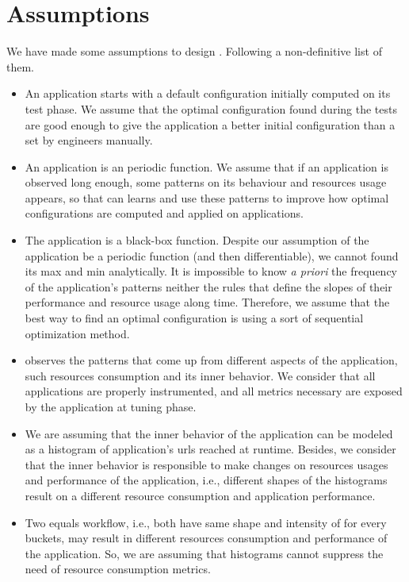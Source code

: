 \section{Assumptions}

We have made some assumptions to design \name. Following a non-definitive list of them.

\begin{itemize}

\item An application starts with a default configuration initially computed on its test phase. We assume that the
  optimal configuration found during the tests are good enough to give the application a better initial configuration
    than a set by engineers manually.

\item An application is an periodic function. We assume that if an application is observed long enough, some patterns
  on its behaviour and resources usage appears, so that \name can learns and use these patterns to improve how optimal
    configurations are computed and applied on applications.

\item The application is a black-box function. Despite our assumption of the application be a periodic function (and
  then differentiable), we cannot found its max and min analytically. It is impossible to know \textit{a priori} the
    frequency of the application's patterns neither the rules that define the slopes of their performance and resource
    usage along time. Therefore, we assume that the best way to find an optimal configuration is using a sort of
    sequential optimization method.

\item \name observes the patterns that come up from different aspects of the application, such resources consumption
  and its inner behavior. We consider that all applications are properly instrumented, and all metrics necessary
    are exposed by the application at tuning phase.

\item We are assuming that the inner behavior of the application can be modeled as a histogram of application's urls
  reached at runtime. Besides, we consider that the inner behavior is responsible to make changes on resources usages
    and performance of the application, i.e., different shapes of the histograms result on a different resource
    consumption and application performance.

\item Two equals workflow, i.e., both have same shape and intensity of for every buckets, may result in different
  resources consumption and performance of the application. So, we are assuming that histograms cannot suppress the
    need of resource consumption metrics.


\end{itemize}

